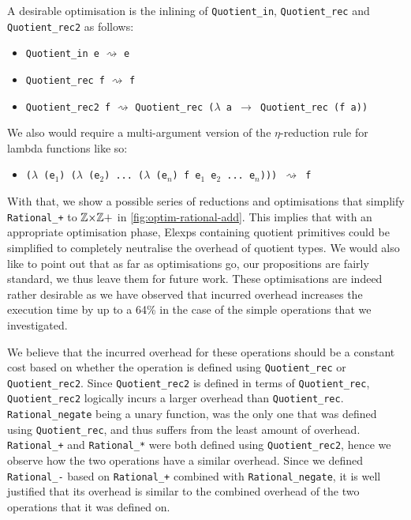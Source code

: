 \documentclass[12pt,twoside,maitrise]{dms}
\theoremstyle{definition}
\numberwithin{equation}{section}
\numberwithin{table}{chapter}
\numberwithin{figure}{chapter}
\newcommand\id[1] {\texttt{#1}}
\newcommand\fn[1] {\texttt{#1}}
\begin{document}
A desirable optimisation is the inlining of \id{Quotient\_in}, \id{Quotient\_rec} and
\id{Quotient\_rec2} as follows:

\begin{itemize}
  \item{\fn{Quotient\_in e} $\rightsquigarrow$ \id{e}}

  \item{\fn{Quotient\_rec f} $\rightsquigarrow$ \id{f}}

  \item{\fn{Quotient\_rec2 f} $\rightsquigarrow$ \fn{Quotient\_rec ($\lambda$ a $\rightarrow$ Quotient\_rec (f a))}}
\end{itemize}

We also would require a multi-argument version of the $\eta$-reduction rule for
lambda functions like so:

\begin{itemize}
  \item{\fn{($\lambda$ (e$_1$) ($\lambda$ (e$_2$) ... ($\lambda$ (e$_n$) f e$_1$ e$_2$ ... e$_n$))) $\rightsquigarrow$ f}}
\end{itemize}

With that, we show a possible series of reductions and optimisations that
simplify \fn{Rational\_+} to $\mathbb{Z}{\times}\mathbb{Z}+$ in \autoref{fig:optim-rational-add}.
This implies that with an appropriate optimisation phase, Elexps containing
quotient primitives could be simplified to completely neutralise the overhead of
quotient types. We would also like to point out that as far as optimisations go,
our propositions are fairly standard, we thus leave them for future work. These
optimisations are indeed rather desirable as we have observed that incurred
overhead increases the execution time by up to a 64\% in the case of the simple
operations that we investigated.

We believe that the incurred overhead for these operations should be a constant
cost based on whether the operation is defined using \id{Quotient\_rec} or
\id{Quotient\_rec2}. Since \id{Quotient\_rec2} is defined in terms of
\id{Quotient\_rec}, \id{Quotient\_rec2} logically incurs a larger overhead than
\id{Quotient\_rec}. \id{Rational\_negate} being a unary function, was the only
one that was defined using \id{Quotient\_rec}, and thus suffers from the least
amount of overhead. \id{Rational\_+} and \id{Rational\_*} were both defined
using \id{Quotient\_rec2}, hence we observe how the two operations have a
similar overhead. Since we defined \id{Rational\_-} based on \id{Rational\_+}
combined with \id{Rational\_negate}, it is well justified that its overhead is
similar to the combined overhead of the two operations that it was defined on.
\end{document}
